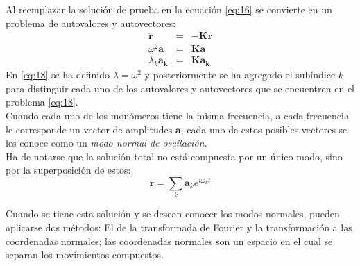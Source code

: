 Al reemplazar la soluci\'{o}n de prueba en la ecuaci\'{o}n \eqref{eq:16} se convierte en un problema de autovalores y autovectores:
\begin{eqnarray}\label{eq:18}
\ddot{\mathbf{r}}&=&-\mathbf{K}\mathbf{r} \nonumber \\
\omega^2\mathbf{a}&=&\mathbf{K}\mathbf{a} \nonumber \\
\lambda_{k}\mathbf{a_{k}}&=&\mathbf{K}\mathbf{a_{k}}
\end{eqnarray}
En \eqref{eq:18} se ha definido $\lambda=\omega^2$ y posteriormente se ha agregado el sub\'{i}ndice $k$ para distinguir cada uno de los autovalores y autovectores que se encuentren en el problema \eqref{eq:18}.\\
Cuando cada uno de los mon\'{o}meros tiene la misma frecuencia, a cada frecuencia le corresponde un vector de amplitudes $\mathbf{a}$, cada uno de estos posibles vectores se les conoce como un \textit{modo normal de oscilaci\'{o}n}.\\

Ha de notarse que la soluci\'{o}n total no est\'{a} compuesta por un \'{u}nico modo, sino por la superposici\'{o}n de estos:
\begin{equation}\label{eq:tot}
\mathbf{r}=\sum_k\mathbf{a}_ke^{i\omega_k t}
\end{equation}

Cuando se tiene esta soluci\'{o}n y se desean conocer los modos normales, pueden aplicarse dos m\'{e}todos: El de la transformada de Fourier y la transformaci\'{o}n a las coordenadas normales; las coordenadas normales son un espacio en el cual se separan los movimientos compuestos.
